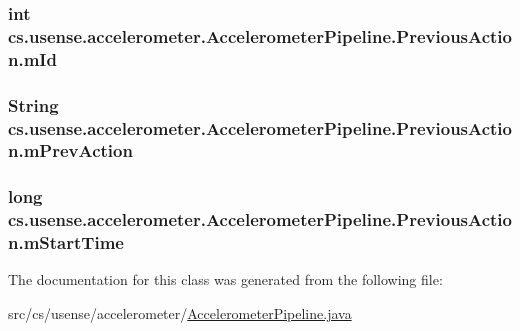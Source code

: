 \subsubsection[{m\+Id}]{\setlength{\rightskip}{0pt plus 5cm}int cs.\+usense.\+accelerometer.\+Accelerometer\+Pipeline.\+Previous\+Action.\+m\+Id}\label{classcs_1_1usense_1_1accelerometer_1_1_accelerometer_pipeline_1_1_previous_action_aab60173c4c19a8581713b3f41b85abb0}
\hypertarget{classcs_1_1usense_1_1accelerometer_1_1_accelerometer_pipeline_1_1_previous_action_a2ff7dbe285a08af27eb3de452ef97ade}{}
\subsubsection[{m\+Prev\+Action}]{\setlength{\rightskip}{0pt plus 5cm}String cs.\+usense.\+accelerometer.\+Accelerometer\+Pipeline.\+Previous\+Action.\+m\+Prev\+Action}\label{classcs_1_1usense_1_1accelerometer_1_1_accelerometer_pipeline_1_1_previous_action_a2ff7dbe285a08af27eb3de452ef97ade}
\hypertarget{classcs_1_1usense_1_1accelerometer_1_1_accelerometer_pipeline_1_1_previous_action_a158be18c85f46142511e3307f3321ca0}{}
\subsubsection[{m\+Start\+Time}]{\setlength{\rightskip}{0pt plus 5cm}long cs.\+usense.\+accelerometer.\+Accelerometer\+Pipeline.\+Previous\+Action.\+m\+Start\+Time}\label{classcs_1_1usense_1_1accelerometer_1_1_accelerometer_pipeline_1_1_previous_action_a158be18c85f46142511e3307f3321ca0}


The documentation for this class was generated from the following file\+:\begin{DoxyCompactItemize}
\item 
src/cs/usense/accelerometer/\hyperlink{_accelerometer_pipeline_8java}{Accelerometer\+Pipeline.\+java}\end{DoxyCompactItemize}
